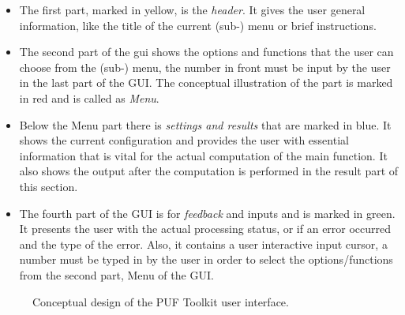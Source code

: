 \begin{itemize}
	\item The first part, marked in yellow, is the \emph{header}. It gives the user general information, like the title of the current (sub-) menu or brief instructions.
	\item The second part of the gui shows the options and functions that the user can choose from the (sub-) menu, the number in front must be input by the user in the last part of the GUI. The conceptual illustration of the part is marked in red and is called as \emph{Menu}.
	\item Below the Menu part there is \emph{settings and results} that are marked in blue. It shows the current configuration and provides the user with essential information that is vital for the actual computation of the main function. It also shows the output after the computation is performed in the result part of this section.
	\item The fourth part of the GUI is for \emph{feedback} and inputs and is marked in green. It presents the user with the actual processing status, or if an error occurred and the type of the error. Also, it contains a user interactive input cursor, a number must be typed in by the user in order to select the options/functions from the second part, Menu of the GUI.
\end{itemize}

\begin{figure}
\centering
{}
\caption{Conceptual design of the PUF Toolkit user interface.}
\label{img:gui_design}
\end{figure}

